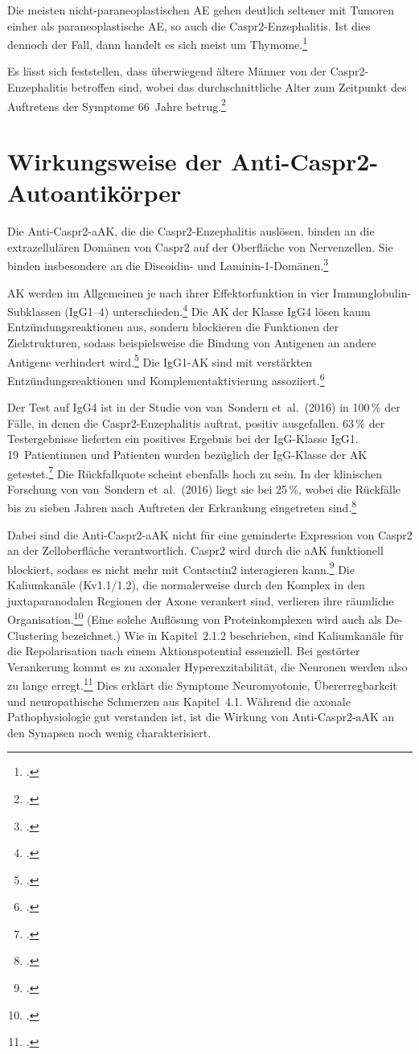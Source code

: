 Die meisten nicht-paraneoplastischen AE gehen deutlich seltener mit
Tumoren einher als paraneoplastische AE, so auch die
Caspr2-Enzephalitis. Ist dies dennoch der Fall, dann handelt es sich
meist um Thymome.\footcite[S.~527; 530]{Heine2022}

Es lässt sich feststellen, dass überwiegend ältere Männer von der
Caspr2-Enzephalitis betroffen sind, wobei das durchschnittliche Alter zum
Zeitpunkt des Auftretens der Symptome 66~Jahre
betrug.\footcite[S.~522--523; 526]{VanSonderen2016}

\section{Wirkungsweise der Anti-Caspr2-Autoantikörper}

Die Anti-Caspr2-aAK, die die Caspr2-Enzephalitis auslösen, binden an die
extrazellulären Domänen von Caspr2 auf der Oberfläche von Nervenzellen.
Sie binden insbesondere an die Discoidin- und
Laminin-1-Domänen.\footcite[S.~6]{Olsen2015}

AK werden im Allgemeinen je nach ihrer Effektorfunktion in vier
Immunglobulin-Subklassen (IgG1--4)
unterschieden.\footcite{Mitrevski}
Die AK der Klasse IgG4 lösen kaum Entzündungsreaktionen aus, sondern
blockieren die Funktionen der Zielstrukturen, sodass beispielsweise die
Bindung von Antigenen an andere Antigene verhindert
wird.\footcite{AntwerpesIgG4}
Die IgG1-AK sind mit verstärkten Entzündungsreaktionen und
Komplementaktivierung assoziiert.\footcite{Mitrevski}

Der Test auf IgG4 ist in der Studie von van~Sondern et~al.\ (2016) in
100\,\% der Fälle, in denen die Caspr2-Enzephalitis auftrat, positiv
ausgefallen. 63\,\% der Testergebnisse lieferten ein positives Ergebnis
bei der IgG-Klasse IgG1. 19~Patientinnen und Patienten wurden bezüglich
der IgG-Klasse der AK
getestet.\footcite[S.~524]{VanSonderen2016}
Die Rückfallquote scheint ebenfalls hoch zu sein. In der klinischen
Forschung von van~Sondern et~al.\ (2016) liegt sie bei 25\,\%, wobei die
Rückfälle bis zu sieben Jahren nach Auftreten der Erkrankung eingetreten
sind.\footcite[S.~524]{VanSonderen2016}

Dabei sind die Anti-Caspr2-aAK nicht für eine geminderte Expression von
Caspr2 an der Zelloberfläche verantwortlich. Caspr2 wird durch die aAK
funktionell blockiert, sodass es nicht mehr mit Contactin2 interagieren
kann.\footcite[S.~6--7]{Patterson2018}
Die Kaliumkanäle (Kv1.1/1.2), die normalerweise durch den Komplex in den
juxtaparanodalen Regionen der Axone verankert sind, verlieren ihre
räumliche
Organisation.\footcites{Mitrevski}[S.~8]{Patterson2018}
(Eine solche Auflösung von Proteinkomplexen wird auch als
De-Clustering bezeichnet.)
Wie in Kapitel~2.1.2 beschrieben, sind Kaliumkanäle für die
Repolarisation nach einem Aktionspotential essenziell. Bei gestörter
Verankerung kommt es zu axonaler Hyperexzitabilität, die Neuronen werden
also zu lange
erregt.\footcite[S.~525--526]{VanSonderen2016}
Dies erklärt die Symptome Neuromyotonie, Übererregbarkeit und
neuropathische Schmerzen aus Kapitel~4.1. Während die axonale Pathophysiologie gut verstanden ist,
ist die Wirkung von Anti-Caspr2-aAK an den Synapsen noch wenig
charakterisiert.
